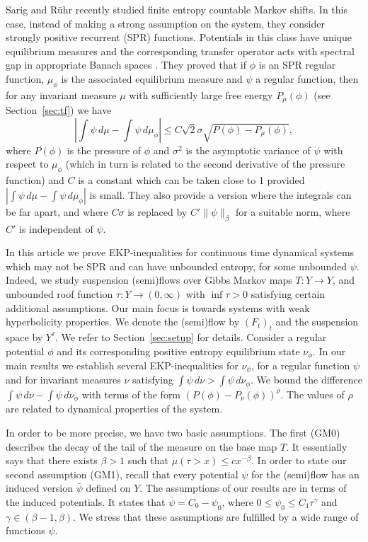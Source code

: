 \documentclass[12pt]{article}
\numberwithin{equation}{section}
\newcommand{\F}{F}
\begin{document}
Sarig and  
R\"uhr  recently studied finite entropy countable Markov shifts. In this case, instead of making a strong assumption 
on the system, they consider strongly positive recurrent (SPR) functions. 
Potentials in this class have unique equilibrium measures and the corresponding transfer operator acts with spectral 
gap in appropriate Banach spaces \cite[Theorem 2.1]{CyrSar09}. They proved \cite[Theorem 6.1]{RuhSar22} that if $\phi$ 
is an SPR regular function, $\mu_{\phi}$ is the associated equilibrium measure and $\psi$ a regular function, 
then for any invariant measure $\mu$ with sufficiently large free energy $P_{\mu}(\phi)$ 
(see Section~\ref{sec:tf}) we have
\begin{equation} \label{eq:ruh-sar}
\left|	\int \psi \, d \mu - \int \psi \, d \mu_\phi	\right| \leq  C\sqrt2 \sigma \sqrt{P(\phi)- P_{\mu}(\phi)},
\end{equation}
where $P(\phi)$ is the pressure of $\phi$ and $\sigma^2$ is the asymptotic variance of $\psi$ with respect to $\mu_\phi$ 
(which in turn is related to the second derivative of the pressure function) and $C$ is a constant which can be taken close to 1 provided $\left|	\int \psi \, d \mu - \int \psi \, d \mu_\phi	\right|$ is small. They also provide a version where the integrals can be far apart, and where $C \sigma$ is replaced by $C'\|\psi\|_\beta$ for a suitable norm, where $C'$ is independent of $\psi$. 


In this article we prove EKP-inequalities for continuous time dynamical systems which may not be SPR and can have unbounded entropy, for some unbounded $\psi$. Indeed, we study suspension (semi)flows over Gibbs Markov maps  $T:Y\to Y$, and unbounded roof function $\tau:Y\to (0, \infty)$
with $\inf\tau>0$ satisfying certain additional assumptions.  Our main focus is towards systems with weak hyperbolicity properties. We denote the (semi)flow by $(\F_t)_t$ and the suspension space by $Y^{\tau}$.   We refer to Section~\ref{sec:setup} for details.  Consider a regular potential $\phi$ and its corresponding positive entropy equilibrium state $\nu_{\phi}$. In our main results we establish several EKP-inequalities for $\nu_{\phi}$, for a regular function $\psi$ and for invariant measures $\nu$ satisfying $\int \psi \, d \nu > \int \psi \, d \nu_{\phi}$. We bound the difference $\int \psi \, d \nu - \int \psi \, d \nu_{\phi}$ with terms of the form $(P(\phi) - P_{\nu}(\phi))^{\rho}$. The values of $\rho$ are related to dynamical properties of the system. 

In order to be more precise, we have two basic assumptions. The first (GM0) describes the decay of the tail of the measure on the base map $T$. It essentially says that there exists $\beta >1$ such that $\mu(\tau >x) \leq cx^{-\beta}$.
In order to state our second assumption (GM1), recall that every potential $\psi$ for the (semi)flow has an induced version $\bar \psi$ defined on $Y$. The assumptions of our results are in terms of the induced potentials.  It states that $\bar \psi= C_0 -\psi_0$, where $0 \leq \psi_0 \leq C_1 \tau^{\gamma}$ and $\gamma \in (\beta-1, \beta)$. 
We stress that these assumptions are fulfilled by a wide range of functions $\psi$.   
\end{document}
